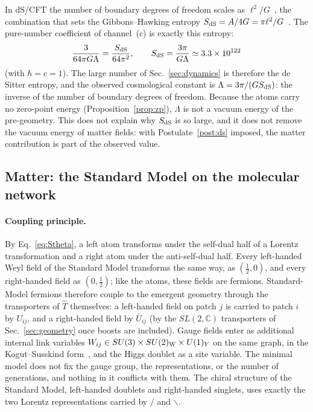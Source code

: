 \documentclass[reprint,aps,prd,amsmath,amssymb,superscriptaddress,nofootinbib,floatfix]{revtex4-2}
\theoremstyle{plain}
\theoremstyle{definition}
\theoremstyle{remark}
\newcommand{\Lat}{\ensuremath{/}}                 %
\newcommand{\Rat}{\ensuremath{\backslash}}        %
\newcommand{\Tc}{\hat{T}}
\newcommand{\SLC}{SL(2,\mathbb{C})}
\begin{document}
In dS/CFT the number of boundary degrees of freedom scales as $\ell^2/G$~\cite{Strominger2001}, the combination that
sets the Gibbons--Hawking entropy $S_{\rm dS}=A/4G=\pi\ell^2/G$~\cite{GibbonsHawking1977}. The pure-number coefficient of
channel~(c) is exactly this entropy:
\begin{equation}
\frac{3}{64\pi G\Lambda}=\frac{S_{\rm dS}}{64\pi^2},\qquad S_{\rm dS}=\frac{3\pi}{G\Lambda}\simeq3.3\times10^{122}
\label{eq:entropy}
\end{equation}
(with $\hbar=c=1$). The large number of Sec.~\ref{sec:dynamics} is therefore the de Sitter entropy, and the observed
cosmological constant is $\Lambda=3\pi/(GS_{\rm dS})$: the inverse of the number of boundary degrees of freedom. Because
the atoms carry no zero-point energy (Proposition~\ref{prop:zp}), $\Lambda$ is not a vacuum energy of the pre-geometry.
This does not explain why $S_{\rm dS}$ is so large, and it does not remove the vacuum energy of matter fields: with
Postulate~\ref{post:ds} imposed, the matter contribution is part of the observed value.

\subsection{Matter: the Standard Model on the molecular network}

\paragraph*{Coupling principle.} By Eq.~\eqref{eq:Stheta}, a left atom transforms under the self-dual half of a Lorentz
transformation and a right atom under the anti-self-dual half. Every left-handed Weyl field of the Standard Model
transforms the same way, as $(\tfrac12,0)$, and every right-handed field as $(0,\tfrac12)$; like the atoms, these fields are
fermions. Standard-Model fermions therefore couple to the emergent geometry through the transporters of $\Tc$ themselves: a left-handed field on
patch $j$ is carried to patch $i$ by $U_{ij}$, and a right-handed field by $\bar U_{ij}$ (by the $\SLC$ transporters of
Sec.~\ref{sec:geometry} once boosts are included). Gauge fields enter as additional internal link variables
$W_{ij}\in SU(3)\times SU(2)_{\rm W}\times U(1)_Y$ on the same graph, in the Kogut--Susskind form~\cite{KogutSusskind1975}, and the
Higgs doublet as a site variable. The minimal model does not fix the gauge group, the representations, or the
number of generations, and nothing in it conflicts with them. The chiral structure of the Standard Model,
left-handed doublets and right-handed singlets, uses exactly the two Lorentz representations carried by $\Lat$
and $\Rat$.
\end{document}
